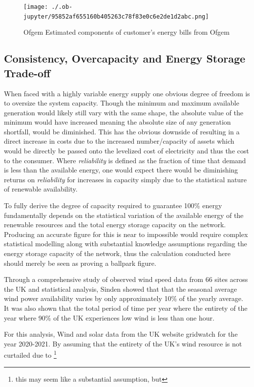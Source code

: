 \documentclass[11pt]{article}
\numberwithin{equation}{section}
\begin{document}
\begin{figure}[H]
\centering
\texttt{[image: ./.ob-jupyter/95852af655160b405263c78f83e0c6e2de1d2abc.png]}
\caption{\label{figPieBillBreakdown}Ofgem Estimated components of customer's energy bills from Ofgem \cite{ofgemBillBreakdown}}
\end{figure}




\subsection{Consistency, Overcapacity and Energy Storage Trade-off}
\label{sec:org411f08f}
When faced with a highly variable energy supply one obvious degree of freedom is to oversize the system capacity. Though the minimum and maximum available generation would likely still vary with the same shape, the absolute value of the minimum would have increased meaning the absolute size of any generation shortfall, would be diminished. This has the obvious downside of resulting in a direct increase in costs due to the increased number/capacity of assets which would be directly be passed onto the levelized cost of electricity and thus the cost to the consumer. Where \emph{reliability} is defined as the fraction of time that demand is less than the available energy, one would expect there would be diminishing returns on \emph{reliability} for increases in capacity simply due to the statistical nature of renewable availability.

To fully derive the degree of capacity required to guarantee 100\% energy fundamentally depends on the statistical variation of the available energy of the renewable resources and the total energy storage capacity on the network. Producing an accurate figure for this is near to impossible would require complex statistical modelling along with substantial knowledge assumptions regarding the energy storage capacity of the network, thus the calculation conducted here should merely be seen as proving a ballpark figure.

Through a comprehensive study of observed wind speed data from 66 sites across the UK and statistical analysis, Sinden \cite{2007} showed that that the seasonal average wind power availability varies by only approximately \textpm{} 10\% of the yearly average. It was also shown that the total period of time per year where the entirety of the year where 90\% of the UK experiences low wind is less than one hour.

For this analysis, Wind and solar data from the UK website gridwatch \cite{gridwatch} for the year 2020-2021. By assuming that the entirety of the UK's wind resource is not curtailed due to \footnote{this may seem like a substantial assumption, but}
\end{document}
